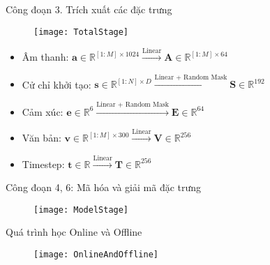 \begin{frame}{Công đoạn 3. Trích xuất các đặc trưng}
	
	\begin{figure}
		\texttt{[image: TotalStage]}
	\end{figure}
	\vspace{10pt}
	\begin{itemize}
		\item Âm thanh: $\mathbf{a} \in \mathbb{R}^{ [1:M] \times 1024} \xrightarrow{\text{Linear} } \mathbf{A} \in \mathbb{R}^{[1:M] \times 64}$
		\item Cử chỉ khởi tạo: $\mathbf{s} \in \mathbb{R}^{[1:N] \times D}  \xrightarrow{\text{Linear + Random Mask} } \mathbf{S} \in \mathbb{R}^{192} $ 
		\item Cảm xúc: $\mathbf{e} \in \mathbb{R}^{6}  \xrightarrow{\text{Linear + Random Mask} } \mathbf{E} \in \mathbb{R}^{64} $ 
		\item Văn bản: $\mathbf{v} \in \mathbb{R}^{[1:M] \times 300}  \xrightarrow{\text{Linear} } \mathbf{V} \in \mathbb{R}^{256}$
		\item Timestep: $\mathbf{t} \in \mathbb{R}  \xrightarrow{\text{Linear} } \mathbf{T} \in \mathbb{R}^{256} $ 
		
		
	\end{itemize}
\end{frame}
	
%	

\begin{frame}{Công đoạn 4, 6: Mã hóa và giải mã đặc trưng}
	\begin{figure}
		\centering
		\texttt{[image: ModelStage]}
	\end{figure}
\end{frame}


\begin{frame}{Quá trình học Online và Offline}
	\begin{figure}
		\centering
		\texttt{[image: OnlineAndOffline]}
	\end{figure}
\end{frame}


